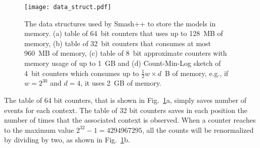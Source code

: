 \begin{figure}[!h]
  \centering
  \texttt{[image: data\_struct.pdf]}
  \caption{The data structures used by Smash++ to store the models in memory. (a) table of 64~bit counters that uses up to 128~MB of memory, (b) table of 32~bit counters that consumes at most 960~MB of memory, (c) table of 8~bit approximate counters with memory usage of up to 1~GB and (d) Count-Min-Log sketch of 4~bit counters which consumes up to $\frac{1}{2} w\times d$~B of memory, e.g., if $w=2^{30}$ and $d=4$, it uses 2~GB of memory.}
  \label{fig.struct}
\end{figure}

The table of 64 bit counters, that is shown in Fig.~\ref{fig.struct}a, simply saves number of events for each context. The table of 32 bit counters saves in each position the number of times that the associated context is observed. When a counter reaches to the maximum value $2^{32}-1=4294967295$, all the counts will be renormalized by dividing by two, as shown in Fig.~\ref{fig.struct}b.

